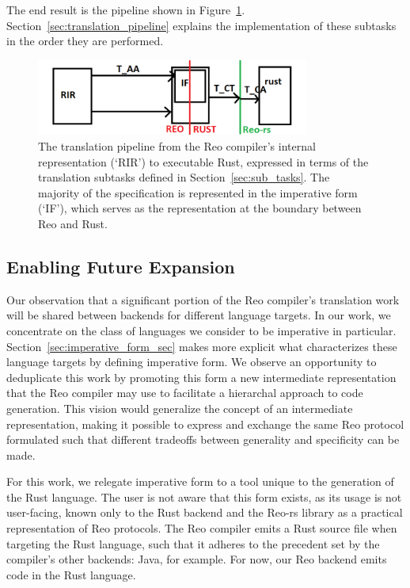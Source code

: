 The end result is the pipeline shown in Figure~\ref{fig:pipeline}. Section~\ref{sec:translation_pipeline} explains the implementation of these subtasks in the order they are performed. 



\begin{figure}
	\centering
	\includegraphics[width=0.80\textwidth]{pipeline.png}
	\caption[TODO.]{The translation pipeline from the Reo compiler's internal representation (`RIR') to executable Rust, expressed in terms of the translation subtasks defined in Section~\ref{sec:sub_tasks}. The majority of the specification is represented in the imperative form (`IF'), which serves as the representation at the boundary between Reo and Rust.}
	\label{fig:pipeline}
\end{figure}

\subsection{Enabling Future Expansion}
Our observation that a significant portion of the Reo compiler's translation work will be shared between backends for different language targets. In our work, we concentrate on the class of languages we consider to be imperative in particular. Section~\ref{sec:imperative_form_sec} makes more explicit what characterizes these language targets by defining imperative form. We observe an opportunity to deduplicate this work by promoting this form a new intermediate representation that the Reo compiler may use to facilitate a hierarchal approach to code generation. This vision would generalize the concept of an intermediate representation, making it possible to express and exchange the same Reo protocol formulated such that different tradeoffs between generality and specificity can be made. 

For this work, we relegate imperative form to a tool unique to the generation of the Rust language. The user is not aware that this form exists, as its usage is not user-facing, known only to the Rust backend and the Reo-rs library as a practical representation of Reo protocols. The Reo compiler emits a Rust source file when targeting the Rust language, such that it adheres to the precedent set by the compiler's other backends: Java, for example. For now, our Reo backend emits code in the Rust language. 


